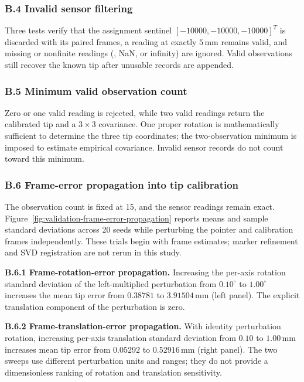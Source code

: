 \documentclass[11pt]{article}
\begin{document}
\subsubsection*{B.4 Invalid sensor filtering}
Three tests verify that the assignment sentinel
$[-10000,-10000,-10000]^T$ is discarded with its paired frames, a reading at
exactly $5\,\mathrm{mm}$ remains valid, and missing or nonfinite readings
(, NaN, or infinity) are ignored.  Valid observations still recover
the known tip after unusable records are appended.

\subsubsection*{B.5 Minimum valid observation count}
Zero or one valid reading is rejected, while two valid readings return the
calibrated tip and a $3\times3$ covariance.  One proper rotation is
mathematically sufficient to determine the three tip coordinates; the
two-observation minimum is imposed to estimate empirical covariance.  Invalid
sensor records do not count toward this minimum.

\subsubsection*{B.6 Frame-error propagation into tip calibration}
The observation count is fixed at 15, and the sensor readings remain exact.
Figure~\ref{fig:validation-frame-error-propagation} reports means and sample
standard deviations across 20 seeds while perturbing the pointer and
calibration frames independently.  These trials begin with frame estimates;
marker refinement and SVD registration are not rerun in this study.

\noindent\textbf{B.6.1 Frame-rotation-error propagation.}
Increasing the per-axis rotation standard deviation of the left-multiplied
perturbation from $0.10^\circ$ to $1.00^\circ$ increases the mean tip error
from $0.38781$ to $3.91504\,\mathrm{mm}$ (left panel).  The explicit
translation component of the perturbation is zero.

\noindent\textbf{B.6.2 Frame-translation-error propagation.}
With identity perturbation rotation, increasing per-axis translation standard
deviation from $0.10$ to $1.00\,\mathrm{mm}$ increases mean tip error from
$0.05292$ to $0.52916\,\mathrm{mm}$ (right panel).  The two sweeps use
different perturbation units and ranges; they do not provide a dimensionless
ranking of rotation and translation sensitivity.
\end{document}
